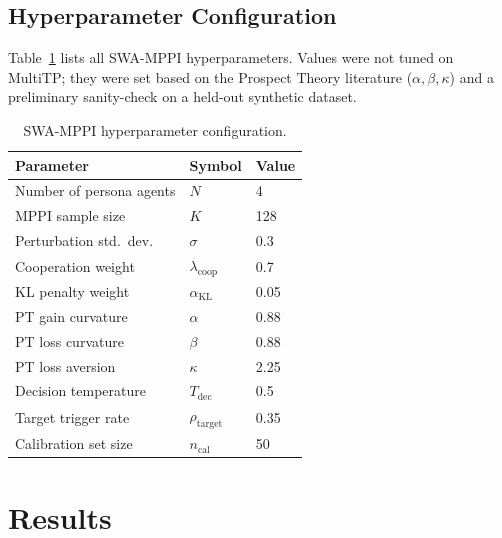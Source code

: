 \documentclass{article}
\begin{document}
\subsection{Hyperparameter Configuration}
\label{sec:exp:hyperparams}

Table~\ref{tab:hyperparams} lists all SWA-MPPI hyperparameters. Values were
not tuned on MultiTP; they were set based on the Prospect Theory literature
($\alpha,\beta,\kappa$) and a preliminary sanity-check on a held-out synthetic
dataset.

\begin{table}[t]
\caption{SWA-MPPI hyperparameter configuration.}
\label{tab:hyperparams}
\centering
\begin{tabular}{lll}
\toprule
Parameter                  & Symbol                  & Value       \\
\midrule
Number of persona agents   & $N$                     & 4           \\
MPPI sample size           & $K$                     & 128         \\
Perturbation std.\ dev.\   & $\sigma$                & 0.3         \\
Cooperation weight         & $\lambda_\text{coop}$   & 0.7         \\
KL penalty weight          & $\alpha_\text{KL}$      & 0.05        \\
PT gain curvature          & $\alpha$                & 0.88        \\
PT loss curvature          & $\beta$                 & 0.88        \\
PT loss aversion           & $\kappa$                & 2.25        \\
Decision temperature       & $T_\text{dec}$          & 0.5         \\
Target trigger rate        & $\rho_\text{target}$    & 0.35        \\
Calibration set size       & $n_\text{cal}$          & 50          \\
\bottomrule
\end{tabular}
\end{table}

\section{Results}
\label{sec:results}
\end{document}
